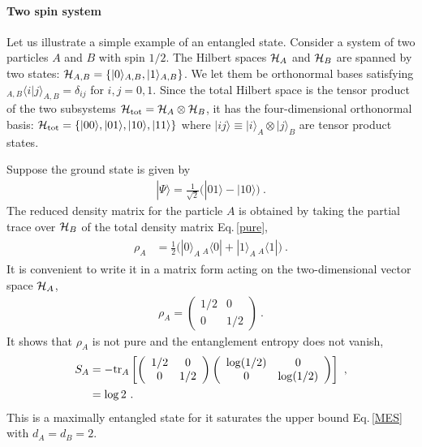 \paragraph{Two spin system}\label{TwoSpin}
Let us illustrate a simple example of an entangled state.
Consider a system of two particles $A$ and $B$ with spin $1/2$.
The Hilbert spaces ${\cal H}_A$ and ${\cal H}_B$ are spanned by two states: ${\cal H}_{A,B} = \{ |0\rangle_{A,B}, |1\rangle_{A,B}\}$.
We let them be orthonormal bases satisfying ${}_{A,B}\langle i | j \rangle_{A,B} = \delta_{ij}$ for $i,j = 0,1$.
Since the total Hilbert space is the tensor product of the two subsystems ${\cal H}_\text{tot} = {\cal H}_A \otimes {\cal H}_B$, it has the four-dimensional orthonormal basis: ${\cal H}_\text{tot} = \{ |00\rangle, |01\rangle, |10\rangle, |11\rangle \}$ where $|ij\rangle \equiv |i\rangle_A \otimes |j\rangle_B$ are tensor product states.

Suppose the ground state is given by
\begin{align}\label{TwoSpinPure}
|\Psi\rangle = \frac{1}{\sqrt{2}} \Big( |01\rangle - |10\rangle \Big) \ .
\end{align}
The reduced density matrix for the particle $A$ is obtained by taking the partial trace over ${\cal H}_B$ of the total density matrix Eq.\,\eqref{pure}, 
\begin{align}
\begin{aligned}
	\rho_A &=  \frac{1}{2}\Big( |0\rangle_A \,{}_A\langle 0 |   +  |1 \rangle_A \,{}_A\langle 1 |\Big) \ .
\end{aligned}
\end{align}
It is convenient to write it in a matrix form acting on the two-dimensional vector space ${\cal H}_A$,
\begin{align}\label{TwoSpinRD}
	\rho_A = \left( 
		\begin{array}{cc}
			1/2 & 0 \\
			0 & 1/2
		\end{array}
		\right) \ .
\end{align}
It shows that $\rho_A$ is not pure and 
the entanglement entropy does not vanish,
\begin{align}\label{EE_TwoSpin}
\begin{aligned}
S_A &= -{\rm tr}_A \left[ \left( 
		\begin{array}{cc}
			1/2 & 0 \\
			0 & 1/2
		\end{array}
		\right)  \left( 
		\begin{array}{cc}
			\log(1/2) & 0 \\
			0 & \log(1/2)
		\end{array}
		\right)    \right] \ , \\
	&=\log 2 \ .
\end{aligned}
\end{align}
This is a maximally entangled state for it saturates the upper bound Eq.\,\eqref{MES} with $d_A = d_B = 2$.


